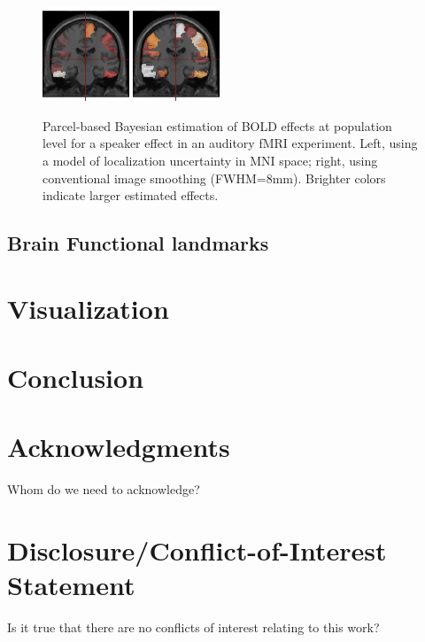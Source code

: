 \documentclass{bioinfo}
\begin{document}
\begin{figure}
\begin{center}
  \includegraphics[width=0.23\textwidth]{parcel_group_analysis.png}
  \includegraphics[width=0.23\textwidth]{parcel_group_analysis_naive.png}
\end{center}
\caption{Parcel-based Bayesian estimation of BOLD effects at
  population level for a speaker effect in an auditory fMRI
  experiment. Left, using a model of localization uncertainty in MNI
  space; right, using conventional image smoothing
  (FWHM=8mm). Brighter colors indicate larger estimated effects.}
\label{fig:parcel_group}
\end{figure}

\subsection{Brain Functional landmarks}

\section{Visualization}

\section{Conclusion}


\section*{Acknowledgments}
Whom do we need to acknowledge?

\section*{Disclosure/Conflict-of-Interest Statement}
Is it true that there are no conflicts of interest relating to this
work?
\end{document}
